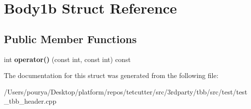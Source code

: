 \hypertarget{structBody1b}{}\section{Body1b Struct Reference}
\label{structBody1b}
\subsection*{Public Member Functions}
\begin{DoxyCompactItemize}
\item 
\hypertarget{structBody1b_aec3f122d60e3b2645f5c87dc339533dc}{}int {\bfseries operator()} (const int, const int) const \label{structBody1b_aec3f122d60e3b2645f5c87dc339533dc}

\end{DoxyCompactItemize}


The documentation for this struct was generated from the following file\+:\begin{DoxyCompactItemize}
\item 
/\+Users/pourya/\+Desktop/platform/repos/tetcutter/src/3rdparty/tbb/src/test/test\+\_\+tbb\+\_\+header.\+cpp\end{DoxyCompactItemize}
